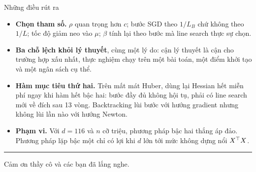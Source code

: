 \documentclass[11pt, aspectratio=169]{beamer}
\begin{document}
\begin{frame}{Những điều rút ra}
  \begin{itemize}
    \item \textbf{Chọn tham số.} $\rho$ quan trọng hơn $c$; bước SGD theo
      $1/L_{B}$ chứ không theo $1/L$; tốc độ giảm neo vào $\mu$; $\beta$ tính lại
      theo bước mà line search thực sự chọn.
    \item \textbf{Ba chỗ lệch khỏi lý thuyết}, cùng một lý do: cận lý thuyết là
      cận cho trường hợp xấu nhất, thực nghiệm chạy trên một bài toán, một điểm
      khởi tạo và một ngân sách cụ thể.
    \item \textbf{Hàm mục tiêu thứ hai.} Trên mất mát Huber, dùng lại Hessian hết
      miễn phí ngay khi hàm hết bậc hai: bước đầy đủ không hội tụ, phải có line
      search mới về đích sau 13 vòng. Backtracking lùi bước với hướng gradient
      nhưng không lùi lần nào với hướng Newton.
    \item \textbf{Phạm vi.} Với $d = 116$ và $n$ cỡ triệu, phương pháp bậc hai
      thắng áp đảo. Phương pháp lặp bậc một chỉ có lợi khi $d$ lớn tới mức không
      dựng nổi $X^{\top} X$.
  \end{itemize}
  \vspace{0.4em}
  \begin{center}
    {\color{accent}\rule{0.4\textwidth}{1pt}}\par
    \vspace{0.4em}
    {\sffamily Cảm ơn thầy cô và các bạn đã lắng nghe.}
  \end{center}
\end{frame}
\end{document}
